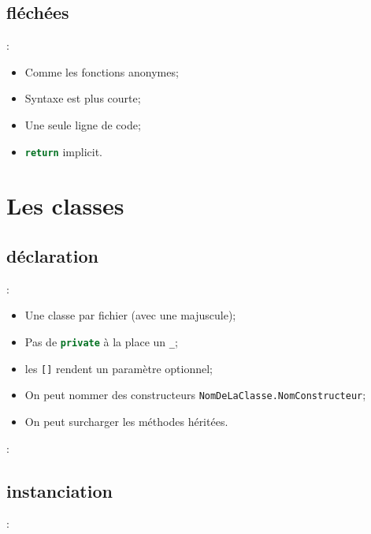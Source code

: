 \documentclass[10pt]{beamer}
\begin{document}
\subsection{fléchées}
\begin{frame}[fragile,t]{\secname : \subsecname}
    \begin{itemize}
        \item Comme les fonctions anonymes;
        \item Syntaxe est plus courte;
        \item Une seule ligne de code;
        \item \lstinline[language=sql]!return! implicit.
    \end{itemize}
    
\end{frame}

\section{Les classes}
\subsection{déclaration}
\begin{frame}[fragile,t]{\secname : \subsecname}
    \begin{itemize}
        \item Une classe par fichier (avec une majuscule);
        \item Pas de \lstinline[language=sql]!private! à la place un \lstinline[language=sql]!_!;
        \item les \lstinline[language=sql]![]! rendent un paramètre optionnel;
        \item On peut nommer des constructeurs \lstinline[language=sql]!NomDeLaClasse.NomConstructeur!;
        \item On peut surcharger les méthodes héritées.
    \end{itemize}
\end{frame}
\begin{frame}[fragile,t]{\secname : \subsecname}
    
\end{frame}

\subsection{instanciation}
\begin{frame}[fragile,t]{\secname : \subsecname}
    
\end{frame}
\end{document}
